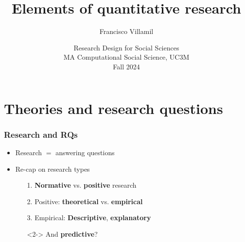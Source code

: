\documentclass[aspectratio=43]{beamer}
\title[Lecture 2: Elements of quantitative research]{\Large Elements of quantitative research}
\author[]{Francisco Villamil}
\date[]{Research Design for Social Sciences\\MA Computational Social Science, UC3M\\Fall 2024}
\begin{document}

\begin{frame}
  \titlepage
\end{frame}

\section{Theories and research questions}

\begin{frame}
\frametitle{Research and RQs}
\centering

\begin{itemize}
  \item Research $=$ answering questions
  \item Re-cap on research types
  \begin{itemize}
    \item[1.] \textbf{Normative} vs. \textbf{positive} research
    \item[2.] Positive: \textbf{theoretical} vs. \textbf{empirical}
    \item[3.] Empirical: \textbf{Descriptive}, \textbf{explanatory}
    \item[]<2-> And \textbf{predictive}?
  \end{itemize}
\end{itemize}

\end{frame}
\end{document}

